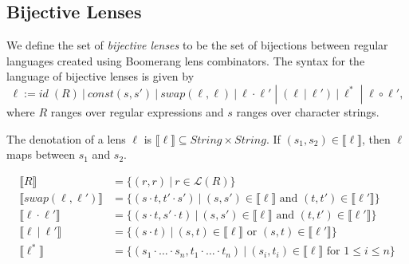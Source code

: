\documentclass{svproc}
\newcommand{\sep}{\ensuremath{\ | \ }}
\begin{document}
\subsection{Bijective Lenses}
We define the set of \textit{bijective lenses} to be the set of bijections
between regular languages created using Boomerang lens combinators.
The syntax for the language of bijective lenses is given by
$$\ell := \mathit{id} \; (R) \sep const(s, s') \sep  swap(\ell,
\ell) \sep \ell \cdot \ell' \; |  \; (\ell \sep \ell') \sep \ell^* \;
| \; \ell \circ \ell',$$ where $R$ ranges over regular expressions and $s$
ranges over character strings.

The denotation of a lens $\ell$ is $\llbracket \ell \rrbracket \subseteq
\mathit{String} \times \mathit{String}$. If $(s_1, s_2) \in \llbracket \ell
\rrbracket$, then $\ell$ maps between $s_1$ and $s_2$.

\begin{align*}
\llbracket R \rrbracket &= \{(r, r) \sep r \in \mathcal{L}(R)\}\\
\llbracket swap(\ell, \ell') \rrbracket &= \{(s \cdot t, t' \cdot s') \sep
(s, s') \in \llbracket \ell \rrbracket \text{ and } (t, t') \in \llbracket
\ell' \rrbracket\}\\
\llbracket \ell \cdot \ell' \rrbracket &= \{(s \cdot t, s' \cdot t) \sep
(s, s') \in \llbracket \ell \rrbracket \text{ and } (t, t') \in \llbracket
\ell' \rrbracket\}\\
\llbracket \ell \sep \ell' \rrbracket &= \{(s \cdot t) \sep
(s, t) \in \llbracket \ell \rrbracket \text{ or } (s, t) \in \llbracket
\ell' \rrbracket\}\\
\llbracket \ell^* \rrbracket &= \{(s_1 \cdot \ldots \cdot s_n, t_1 \cdot \ldots
\cdot t_n) \sep (s_i, t_i) \in \llbracket \ell \rrbracket \text{ for } 1
\leq i \leq n\}
\end{align*}
\end{document}
